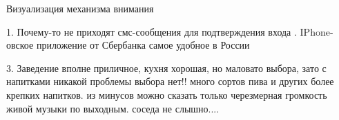 \documentclass{beamer}
\begin{document}
\begin{frame}{Визуализация механизма внимания}

1.
\colorbox{yellow!70}{Почему-то}
\colorbox{yellow!100}{не}
\colorbox{yellow!57}{приходят}
\colorbox{yellow!17}{смс-сообщения}
\colorbox{yellow!5}{для}
\colorbox{yellow!7}{подтверждения}
\colorbox{yellow!0}{входа}
.
\colorbox{yellow!3}{IPhone-овское}
\colorbox{yellow!2}{приложение}
\colorbox{yellow!2}{от}
\colorbox{yellow!30}{Сбербанка}
\colorbox{yellow!89}{самое}
\colorbox{yellow!100}{удобное}
\colorbox{yellow!84}{в}
\colorbox{yellow!82}{России}
\linebreak

3.
\colorbox{yellow!14}{Заведение}
\colorbox{yellow!41}{вполне}
\colorbox{yellow!62}{приличное,}
\colorbox{yellow!78}{кухня}
\colorbox{yellow!99}{хорошая,}
\colorbox{yellow!27}{но}
\colorbox{yellow!25}{маловато}
\colorbox{yellow!11}{выбора,}
\colorbox{yellow!8}{зато}
\colorbox{yellow!2}{с}
\colorbox{yellow!2}{напитками}
\colorbox{yellow!2}{никакой}
\colorbox{yellow!2}{проблемы}
\colorbox{yellow!3}{выбора}
\colorbox{yellow!2}{нет!!}
\colorbox{yellow!2}{много}
\colorbox{yellow!2}{сортов}
\colorbox{yellow!2}{пива}
\colorbox{yellow!3}{и}
\colorbox{yellow!2}{других}
\colorbox{yellow!1}{более}
\colorbox{yellow!2}{крепких}
\colorbox{yellow!1}{напитков.}
\colorbox{yellow!1}{из}
\colorbox{yellow!3}{минусов}
\colorbox{yellow!3}{можно}
\colorbox{yellow!4}{сказать}
\colorbox{yellow!4}{только}
\colorbox{yellow!10}{черезмерная}
\colorbox{yellow!8}{громкость}
\colorbox{yellow!12}{живой}
\colorbox{yellow!8}{музыки}
\colorbox{yellow!4}{по}
\colorbox{yellow!5}{выходным.}
\colorbox{yellow!6}{соседа}
\colorbox{yellow!11}{не}
\colorbox{yellow!11}{слышно....}

\end{frame}
\end{document}
